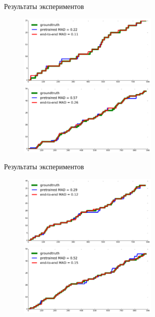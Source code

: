 \documentclass[unicode, dvipsnames]{beamer}
\begin{document}
\begin{frame}{Результаты экспериментов}
	\begin{figure}
		\centering
		\includegraphics[width=0.6\textwidth]{./graphics/fig_7.pdf}\\
		\includegraphics[width=0.6\textwidth]{./graphics/fig_9.pdf}
	\end{figure}
\end{frame}

\begin{frame}{Результаты экспериментов}
	\begin{figure}
		\centering
		\includegraphics[width=0.6\textwidth]{./graphics/fig_v5.pdf}\\
		\includegraphics[width=0.6\textwidth]{./graphics/fig_v9.pdf}
	\end{figure}
\end{frame}
\end{document}

